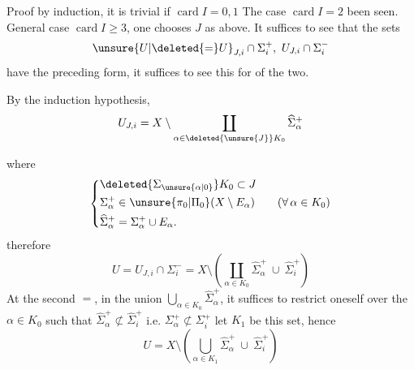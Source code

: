 Proof by induction, it is trivial if $\operatorname{card} I=0,1$ The case $\operatorname{card} I=2$  been seen. General case  $\operatorname{card} I\geq 3$, one chooses $J$ as above. It suffices to see that the sets
\[
\unsure{U|\deleted{=}U}_{J,i}\cap\Sigma_i^+,\ U_{J,i}\cap\Sigma_i^-
\]
have the preceding form, it suffices to see this for  of the two.

By the induction hypothesis, 
\[
U_{J,i}=X\setminus\coprod_{\alpha\in \deleted{\unsure{J}}K_0}\widehat{\Sigma}_\alpha^+
\]

where
\[
\left\{\begin{aligned}
&\deleted{\Sigma_{\unsure{\alpha|0}}}K_0\subset J\\
&\Sigma_\alpha^+\in\unsure{\pi_0|\Pi_0}(X\setminus E_\alpha)\qquad (\forall\,\alpha\in K_0)\\
&\widehat{\Sigma}_\alpha^+=\Sigma_\alpha^+\cup E_\alpha.
\end{aligned}\right.
\]
 therefore
\[
U=U_{J,i}\cap\Sigma_i^-=X\setminus\left(\coprod_{\alpha\in K_0}\widehat{\Sigma}_\alpha^+\ \cup\ \widehat{\Sigma}_i^+\right)
\]
 At the second $=$, in the  union $\bigcup_{\alpha\in K_0}\widehat{\Sigma}_\alpha^+$, it suffices to restrict oneself   over the \deleted{$\Sigma$} $\alpha\in K_0$ such that $\widehat{\Sigma}_\alpha^+\not\subset\widehat{\Sigma}_i^+$ i.e. $\Sigma_\alpha^+\not\subset\Sigma_i^+$ let $K_1$ be this set, hence
\[
U=X\setminus\left(\bigcup_{\alpha\in K_1}\widehat{\Sigma}_\alpha^+\ \cup\ \widehat{\Sigma}_i^+\right)
\]
